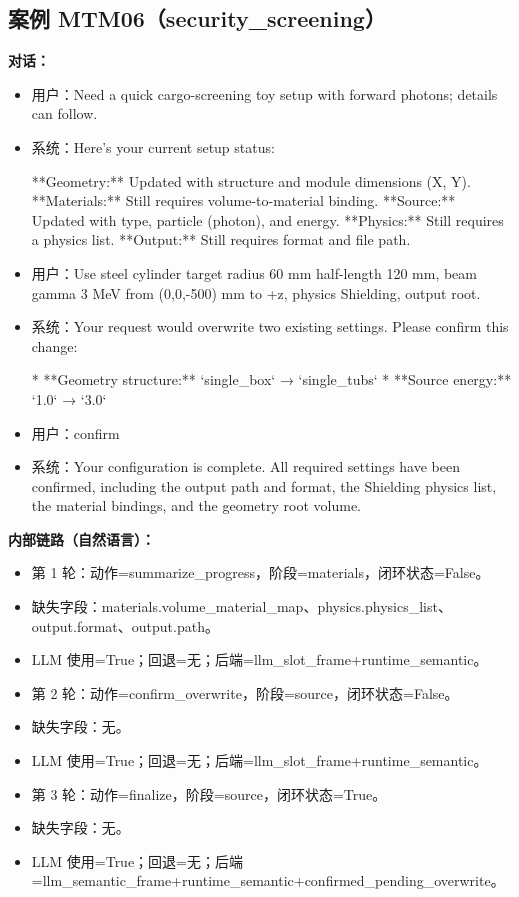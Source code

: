\documentclass[11pt]{ctexart}
\begin{document}
\subsection{案例 MTM06（security\_screening）}
\textbf{对话：}
\begin{itemize}
\item 用户：Need a quick cargo-screening toy setup with forward photons; details can follow.
\item 系统：Here's your current setup status:

**Geometry:** Updated with structure and module dimensions (X, Y).
**Materials:** Still requires volume-to-material binding.
**Source:** Updated with type, particle (photon), and energy.
**Physics:** Still requires a physics list.
**Output:** Still requires format and file path.
\item 用户：Use steel cylinder target radius 60 mm half-length 120 mm, beam gamma 3 MeV from (0,0,-500) mm to +z, physics Shielding, output root.
\item 系统：Your request would overwrite two existing settings. Please confirm this change:

*   **Geometry structure:** `single\_box` → `single\_tubs`
*   **Source energy:** `1.0` → `3.0`
\item 用户：confirm
\item 系统：Your configuration is complete. All required settings have been confirmed, including the output path and format, the Shielding physics list, the material bindings, and the geometry root volume.
\end{itemize}
\textbf{内部链路（自然语言）：}
\begin{itemize}
\item 第 1 轮：动作=summarize\_progress，阶段=materials，闭环状态=False。
\item 缺失字段：materials.volume\_material\_map、physics.physics\_list、output.format、output.path。
\item LLM 使用=True；回退=无；后端=llm\_slot\_frame+runtime\_semantic。
\item 第 2 轮：动作=confirm\_overwrite，阶段=source，闭环状态=False。
\item 缺失字段：无。
\item LLM 使用=True；回退=无；后端=llm\_slot\_frame+runtime\_semantic。
\item 第 3 轮：动作=finalize，阶段=source，闭环状态=True。
\item 缺失字段：无。
\item LLM 使用=True；回退=无；后端=llm\_semantic\_frame+runtime\_semantic+confirmed\_pending\_overwrite。
\end{itemize}
\end{document}
